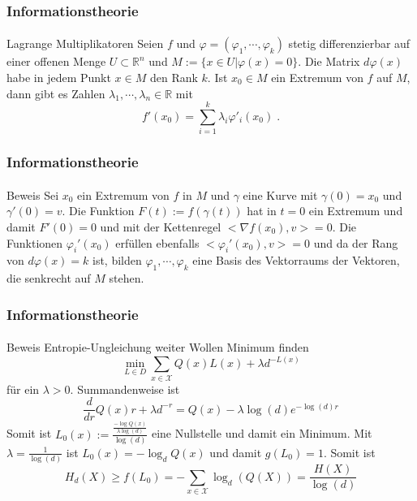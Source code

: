 \documentclass{beamer}
\begin{document}
\begin{frame}
    \frametitle{Informationstheorie}
\framesubtitle{}

\begin{block}{Lagrange Multiplikatoren}
Seien $f$ und $\varphi = (\varphi_1, \cdots , \varphi_k)$ stetig differenzierbar auf einer offenen Menge $U \subset \mathbb{R}^n$ und
 $M := \{  x \in U | \varphi(x) = 0 \}$.
Die Matrix $d \varphi(x)$ habe in jedem Punkt $x \in M$ den Rank $k$. Ist $x_0 \in M$ ein Extremum von $f$ auf $M$, dann gibt es Zahlen $\lambda_1, \cdots , \lambda_n \in \mathbb{R}$ mit
$$ f'(x_0) = \sum_{i= 1}^k \lambda_i \varphi'_i(x_0) \; .$$ 
\end{block}

 \end{frame}



\begin{frame}
    \frametitle{Informationstheorie}
\framesubtitle{}

\begin{block}{Beweis}
Sei $x_0$ ein Extremum von $f$ in $M$ und $\gamma$ eine Kurve mit $\gamma(0)= x_0$ und $\gamma'(0) = v$.
Die Funktion $F(t) := f(\gamma(t))$ hat in $t= 0$ ein Extremum und damit $F'(0) = 0$ und mit der Kettenregel $<\nabla f(x_0), v> = 0$.
Die Funktionen $\varphi_i'(x_0)$ erfüllen ebenfalls $<\varphi_i' (x_0),v> = 0$ und da der Rang von $d \varphi(x)= k$ ist, bilden  $\varphi_1, \cdots , \varphi_k$ eine Basis des Vektorraums der Vektoren, die senkrecht auf $M$ stehen.
\end{block}

 \end{frame}



\begin{frame}
    \frametitle{Informationstheorie}
\framesubtitle{}

\begin{block}{Beweis Entropie-Ungleichung weiter }
Wollen Minimum finden  
$$ \min_{L \in D} \sum_{x \in \mathcal{X}} Q(x) L(x) + \lambda d^{-L(x)}$$
für ein $\lambda > 0$. Summandenweise ist
$$\frac{d}{dr} Q(x) r + \lambda d^{-r} =  Q(x) - \lambda \log(d) e^{-\log(d)r}$$
Somit ist  $L_0(x) := \frac{\frac{- \log Q(x)}{\lambda \log(d)}}{\log(d)}$ eine Nullstelle und damit ein Minimum. Mit $\lambda = \frac{1}{\log(d)}$ ist $L_0(x) = -\log_d Q(x)$  und damit $g(L_0) = 1$. Somit ist
$$ H_d(X) \geq f(L_0) = - \sum_{x \in \mathcal{X}} \log_d (Q(X)) = \frac{H(X)}{\log(d)}$$ 

 \end{block}

 \end{frame}
\end{document}
